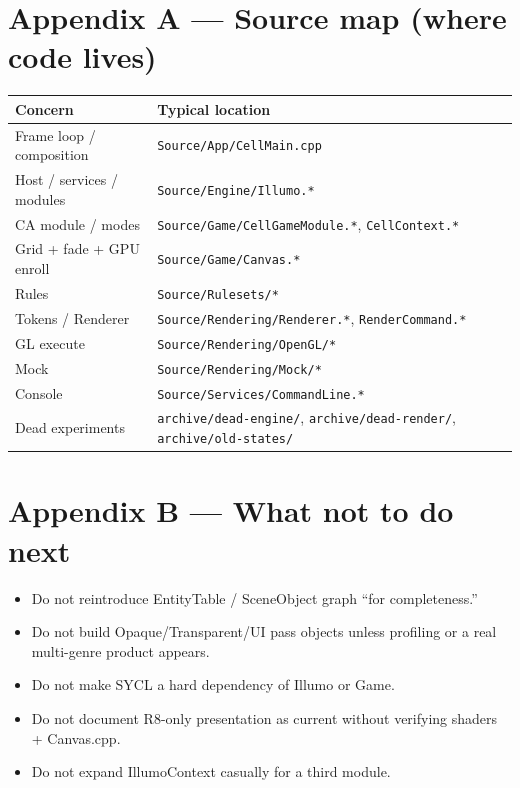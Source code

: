 \documentclass[10pt,a4paper]{article}
\begin{document}
\section{Appendix A --- Source map (where code lives)}
\begin{table}[h!]
\centering
\small
\begin{tabularx}{\textwidth}{l X}
\toprule
\textbf{Concern} & \textbf{Typical location} \\
\midrule
Frame loop / composition & \texttt{Source/App/CellMain.cpp} \\
Host / services / modules & \texttt{Source/Engine/Illumo.*} \\
CA module / modes & \texttt{Source/Game/CellGameModule.*}, \texttt{CellContext.*} \\
Grid + fade + GPU enroll & \texttt{Source/Game/Canvas.*} \\
Rules & \texttt{Source/Rulesets/*} \\
Tokens / Renderer & \texttt{Source/Rendering/Renderer.*}, \texttt{RenderCommand.*} \\
GL execute & \texttt{Source/Rendering/OpenGL/*} \\
Mock & \texttt{Source/Rendering/Mock/*} \\
Console & \texttt{Source/Services/CommandLine.*} \\
Dead experiments & \texttt{archive/dead-engine/}, \texttt{archive/dead-render/}, \texttt{archive/old-states/} \\
\bottomrule
\end{tabularx}
\end{table}

\section{Appendix B --- What not to do next}
\begin{itemize}
    \item Do not reintroduce EntityTable / SceneObject graph ``for completeness.''
    \item Do not build Opaque/Transparent/UI pass objects unless profiling or a real multi-genre product appears.
    \item Do not make SYCL a hard dependency of Illumo or Game.
    \item Do not document R8-only presentation as current without verifying shaders + Canvas.cpp.
    \item Do not expand IllumoContext casually for a third module.
\end{itemize}
\end{document}
